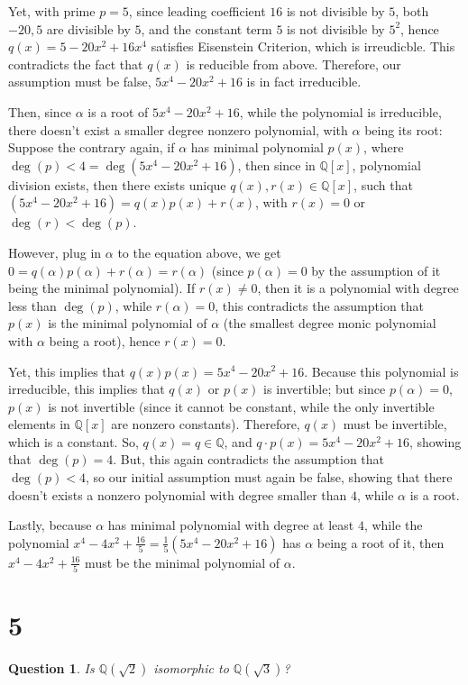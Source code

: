 \documentclass{article}
\newtheorem{question}{Question}
\begin{document}
Yet, with prime $p=5$, since leading coefficient $16$ is not divisible by $5$, both $-20, 5$ are divisible by $5$, and the constant term $5$ is not divisible by $5^2$, hence $q(x)=5-20x^2+16x^4$ satisfies Eisenstein Criterion, which is irreudicble.
This contradicts the fact that $q(x)$ is reducible from above. Therefore, our assumption must be false, $5x^4-20x^2+16$ is in fact irreducible.

\hfil

Then, since $\alpha$ is a root of $5x^4-20x^2+16$, while the polynomial is irreducible, there doesn't exist a smaller degree nonzero polynomial, with $\alpha$ being its root: Suppose the contrary again, if $\alpha$ has minimal polynomial $p(x)$, where $\deg(p)<4 = \deg(5x^4-20x^2+16)$,
then since in $\mathbb{Q}[x]$, polynomial division exists, then there exists unique $q(x),r(x)\in\mathbb{Q}[x]$, such that $(5x^4-20x^2+16)=q(x)p(x)+r(x)$, with $r(x)=0$ or $\deg(r)<\deg(p)$.

However, plug in $\alpha$ to the equation above, we get $0=q(\alpha)p(\alpha)+r(\alpha)=r(\alpha)$ (since $p(\alpha)=0$ by the assumption of it being the minimal polynomial).
If $r(x)\neq 0$, then it is a polynomial with degree less than $\deg(p)$, while $r(\alpha)=0$, this contradicts the assumption that $p(x)$ is the minimal polynomial of $\alpha$ (the smallest degree monic polynomial with $\alpha$ being a root),
hence $r(x)=0$.

Yet, this implies that $q(x)p(x)=5x^4-20x^2+16$. Because this polynomial is irreducible, this implies that $q(x)$ or $p(x)$ is invertible; but since $p(\alpha)=0$, $p(x)$ is not invertible (since it cannot be constant, while the only invertible elements in $\mathbb{Q}[x]$ are nonzero constants).
Therefore, $q(x)$ must be invertible, which is a constant. So, $q(x)=q\in\mathbb{Q}$, and $q\cdot p(x)=5x^4-20x^2+16$, showing that $\deg(p)=4$.
But, this again contradicts the assumption that $\deg(p)<4$, so our initial assumption must again be false, showing that there doesn't exists a nonzero polynomial with degree smaller than $4$, while $\alpha$ is a root.

\hfil

Lastly, because $\alpha$ has minimal polynomial with degree at least $4$, while the polynomial $x^4-4x^2+\frac{16}{5}=\frac{1}{5}(5x^4-20x^2+16)$ has $\alpha$ being a root of it,
then $x^4-4x^2+\frac{16}{5}$ must be the minimal polynomial of $\alpha$.

\break

\section*{5}
\begin{myBox}[]{}
    \begin{question}
        Is $\mathbb{Q}(\sqrt{2})$ isomorphic to $\mathbb{Q}(\sqrt{3})$?
    \end{question}
\end{myBox}
\end{document}
